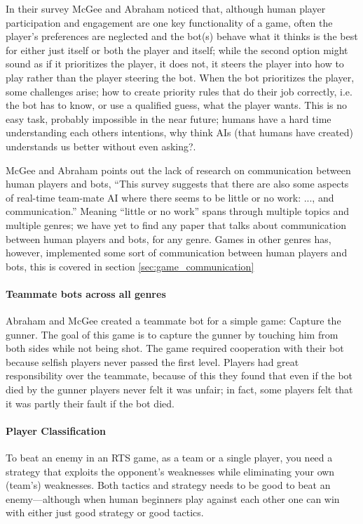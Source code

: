 In their survey\cite{mcgee10} McGee and Abraham noticed that, although human player participation and engagement are one key functionality of a game\cite{reynolds03}, often the player's preferences are neglected and the bot(s) behave what it thinks is the best for either just itself or both the player and itself; while the second option might sound as if it prioritizes the player, it does not, it steers the player into how to play rather than the player steering the bot. When the bot prioritizes the player, some challenges arise; how to create priority rules that do their job correctly\cite{mcgee10}, i.e. the bot has to know, or use a qualified guess, what the player wants. This is no easy task, probably impossible in the near future; humans have a hard time understanding each others intentions, why think AIs (that humans have created) understands us better\cite{norman07} without even asking?.

McGee and Abraham points out the lack of research on communication between human players and bots, “This survey suggests that there are also some aspects of real-time team-mate AI where there seems to be little or no work: ..., and communication.”\cite{mcgee10} Meaning “little or no work” spans through multiple topics and multiple genres; we have yet to find any paper that talks about communication between human players and bots, for any genre. Games in other genres has, however, implemented some sort of communication between human players and bots, this is covered in section \ref{sec:game_communication}

\paragraph{Teammate bots across all genres}
Abraham and McGee created a teammate bot for a simple game: Capture the gunner\cite{abraham10}. The goal of this game is to capture the gunner by touching him from both sides while not being shot. The game required cooperation with their bot because selfish players never passed the first level. Players had great responsibility over the teammate, because of this they found that even if the bot died by the gunner players never felt it was unfair; in fact, some players felt that it was partly their fault if the bot died.

\paragraph{Player Classification}
To beat an enemy in an RTS game, as a team or a single player, you need a strategy that exploits the opponent's weaknesses while eliminating your own (team’s) weaknesses. Both tactics and strategy needs to be good to beat an enemy—although when human beginners play against each other one can win with either just good strategy or good tactics.

